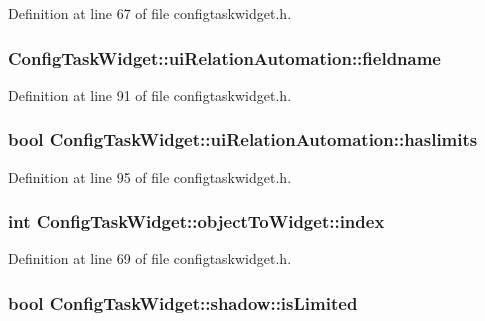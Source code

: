 \-Definition at line 67 of file configtaskwidget.\-h.

\hypertarget{group___u_a_v_object_widget_utils_ga727a26d7cef842f8e7cd274117a1153d}{
\subsubsection[{fieldname}]{ {\bf \-Config\-Task\-Widget\-::ui\-Relation\-Automation\-::fieldname}}}\label{group___u_a_v_object_widget_utils_ga727a26d7cef842f8e7cd274117a1153d}


\-Definition at line 91 of file configtaskwidget.\-h.

\hypertarget{group___u_a_v_object_widget_utils_ga73f9beb614502506b14c6b5d235b9d44}{
\subsubsection[{haslimits}]{\setlength{\rightskip}{0pt plus 5cm}bool {\bf \-Config\-Task\-Widget\-::ui\-Relation\-Automation\-::haslimits}}}\label{group___u_a_v_object_widget_utils_ga73f9beb614502506b14c6b5d235b9d44}


\-Definition at line 95 of file configtaskwidget.\-h.

\hypertarget{group___u_a_v_object_widget_utils_ga32127d63078e835a69c50d20ea1a678b}{
\subsubsection[{index}]{\setlength{\rightskip}{0pt plus 5cm}int {\bf \-Config\-Task\-Widget\-::object\-To\-Widget\-::index}}}\label{group___u_a_v_object_widget_utils_ga32127d63078e835a69c50d20ea1a678b}


\-Definition at line 69 of file configtaskwidget.\-h.

\hypertarget{group___u_a_v_object_widget_utils_ga712acd84a5850623406835776b1840b4}{
\subsubsection[{is\-Limited}]{\setlength{\rightskip}{0pt plus 5cm}bool {\bf \-Config\-Task\-Widget\-::shadow\-::is\-Limited}}}\label{group___u_a_v_object_widget_utils_ga712acd84a5850623406835776b1840b4}


